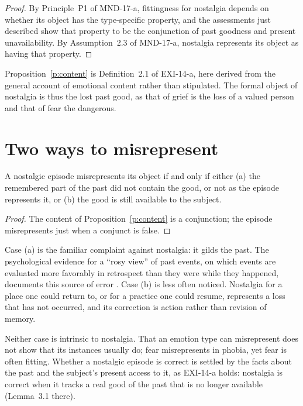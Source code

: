 \documentclass{situationist-preprint}
\begin{document}
\begin{proof}
By Principle~P1 of MND-17-a, fittingness for nostalgia depends on whether its object has the type-specific property, and the assessments just described show that property to be the conjunction of past goodness and present unavailability. By Assumption~2.3 of MND-17-a, nostalgia represents its object as having that property.
\end{proof}

Proposition~\ref{p:content} is Definition~2.1 of EXI-14-a, here derived from the general account of emotional content rather than stipulated. The formal object of nostalgia is thus the lost past good, as that of grief is the loss of a valued person and that of fear the dangerous.

\section{Two ways to misrepresent}

\begin{corollary}\label{c:mis}
A nostalgic episode misrepresents its object if and only if either (a) the remembered part of the past did not contain the good, or not as the episode represents it, or (b) the good is still available to the subject.
\end{corollary}

\begin{proof}
The content of Proposition~\ref{p:content} is a conjunction; the episode misrepresents just when a conjunct is false.
\end{proof}

Case (a) is the familiar complaint against nostalgia: it gilds the past. The psychological evidence for a \enquote{rosy view} of past events, on which events are evaluated more favorably in retrospect than they were while they happened, documents this source of error \citep{Mitchell1997}. Case (b) is less often noticed. Nostalgia for a place one could return to, or for a practice one could resume, represents a loss that has not occurred, and its correction is action rather than revision of memory.

Neither case is intrinsic to nostalgia. That an emotion type can misrepresent does not show that its instances usually do; fear misrepresents in phobia, yet fear is often fitting. Whether a nostalgic episode is correct is settled by the facts about the past and the subject's present access to it, as EXI-14-a holds: nostalgia is correct when it tracks a real good of the past that is no longer available (Lemma~3.1 there).
\end{document}
